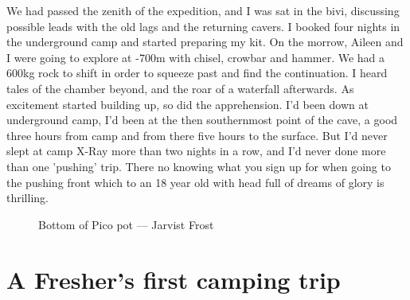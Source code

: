 We had passed the zenith of the expedition, and I was sat in the bivi, discussing possible leads with the old lags and the returning cavers. I booked four nights in the underground camp and started preparing my kit. On the morrow, Aileen and I were going to explore at -700m with chisel, crowbar and hammer. We had a 600kg rock to shift in order to squeeze past and find the continuation. I heard tales of the chamber beyond, and the roar of a waterfall afterwards. As excitement started building up, so did the apprehension. I'd been down at underground camp, I'd been at the then southernmost point of the cave, a good three hours from camp and from there five hours to the surface. But I'd never slept at camp X-Ray more than two nights in a row, and I'd never done more than one 'pushing' trip. 
There no knowing what you sign up for when going to the pushing front which to an 18 year old with head full of dreams of glory is thrilling.

\begin{figure}[t!]
\checkoddpage \ifoddpage \forcerectofloat \else \forceversofloat \fi
\centering
{}
\caption{Bottom of Pico pot --- Jarvist Frost}
\label{Pico}
\end{figure}

\section{ A Fresher's first camping trip}

\begin{marginfigure}
\end{marginfigure}


